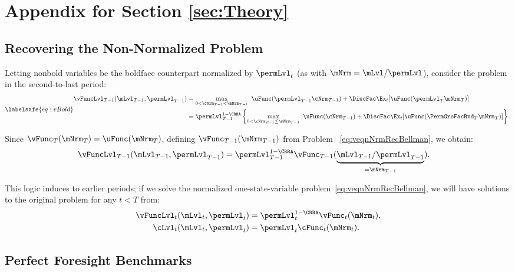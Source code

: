 \documentclass[\econtexRoot/BufferStockTheory]{subfiles}
\begin{document}
\section{Appendix for Section \ref{sec:Theory}}\label{sec:ApndxConcaveCFunc}

\subsection{Recovering the Non-Normalized Problem}\label{sec:recoverLevels}
Letting nonbold variables be the boldface counterpart normalized by $\permLvl_{t}$ (as with $\mNrm=\mLvl/\permLvl$), consider the problem in the second-to-last period:
\begin{equation}\labelsafe{eq:vBold}
  \begin{split}
    \vFuncLvl_{T-1}(\mLvl_{T-1},\permLvl_{T-1})
    & =  \max_{0< \cNrm_{T-1}< \mNrm_{T-1}}~
    \uFunc(\permLvl_{T-1}\cNrm_{T-1}) + \DiscFac  \Ex_{t}[\uFunc(\permLvl_{T}{\mNrm}
    _{T})]  \\
    & = \permLvl_{T-1}^{1-\CRRA}
    \left\{\max_{0<\cNrm_{T-1}\leq \mNrm_{T-1}}~ \uFunc(\cNrm_{T-1}) + \DiscFac \Ex_{t}[ \uFunc( {\PermGroFacRnd}_{T}
      {\mNrm}_{T}) ] \right\}.
  \end{split}
\end{equation}

\hypertarget{The-Related-Problem}{}

Since $\vFunc_{T}(\mNrm_{T}) = \uFunc(\mNrm_{T})$, defining $\vFunc_{T-1}(\mNrm_{T-1})$ from Problem ~\eqref{eq:veqnNrmRecBellman}, we obtain:
\begin{align*}
  \vFuncLvl_{T-1}(\mLvl_{T-1},\permLvl_{T-1})  & = \permLvl_{T-1}^{1-\CRRA} \vFunc_{T-1}(\underbrace{\mLvl_{T-1}/\permLvl_{T-1}}_{=\mNrm_{T-1}}).
\end{align*}

This logic induces to earlier periods; if we solve the normalized one-state-variable problem~\eqref{eq:veqnNrmRecBellman}, we will have solutions to the original problem for any $t<T$ from:
\begin{align*}
  \vFuncLvl_{t}(\mLvl_{t},\permLvl_{t})  & = \permLvl_{t}^{1-\CRRA}\vFunc_{t}(\mNrm_{t}),
  \\ \cLvl_{t}(\mLvl_{t},\permLvl_{t})  & = \permLvl_{t}\cFunc_{t}(\mNrm_{t}).
\end{align*}

\subsection{Perfect Foresight Benchmarks}\label{subsec:PFBProofs}\hypertarget{PFBProofs}{}
\end{document}
